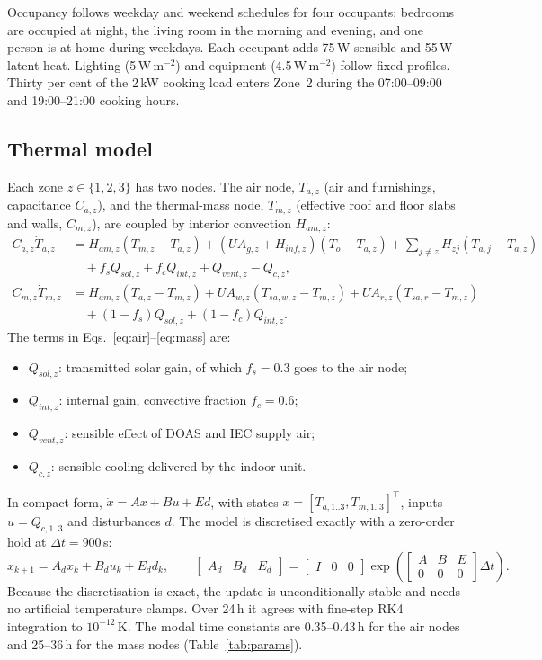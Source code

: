 Occupancy follows weekday and weekend schedules for four occupants: bedrooms are
occupied at night, the living room in the morning and evening, and one person is at
home during weekdays. Each occupant adds 75\,W sensible and 55\,W latent heat. Lighting
(5\,W\,m$^{-2}$) and equipment (4.5\,W\,m$^{-2}$) follow fixed profiles. Thirty per
cent of the 2\,kW cooking load enters Zone~2 during the 07:00--09:00 and 19:00--21:00
cooking hours.

\subsection{Thermal model}
Each zone $z\in\{1,2,3\}$ has two nodes. The air node, $T_{a,z}$ (air and furnishings,
capacitance $C_{a,z}$), and the thermal-mass node, $T_{m,z}$ (effective roof and floor
slabs and walls, $C_{m,z}$), are coupled by interior convection $H_{am,z}$:
\begin{align}
C_{a,z}\dot T_{a,z} &= H_{am,z}(T_{m,z}-T_{a,z}) + (UA_{g,z}+H_{inf,z})(T_o-T_{a,z})
  + \sum_{j\neq z} H_{zj}(T_{a,j}-T_{a,z}) \nonumber\\
  &\quad + f_s Q_{sol,z} + f_c Q_{int,z} + Q_{vent,z} - Q_{c,z}, \label{eq:air}\\
C_{m,z}\dot T_{m,z} &= H_{am,z}(T_{a,z}-T_{m,z}) + UA_{w,z}(T_{sa,w,z}-T_{m,z})
  + UA_{r,z}(T_{sa,r}-T_{m,z}) \nonumber\\
  &\quad + (1-f_s)Q_{sol,z} + (1-f_c)Q_{int,z}. \label{eq:mass}
\end{align}
The terms in Eqs.~\eqref{eq:air}--\eqref{eq:mass} are:
\begin{itemize}
  \item $Q_{sol,z}$: transmitted solar gain, of which $f_s=0.3$ goes to the air node;
  \item $Q_{int,z}$: internal gain, convective fraction $f_c=0.6$;
  \item $Q_{vent,z}$: sensible effect of DOAS and IEC supply air;
  \item $Q_{c,z}$: sensible cooling delivered by the indoor unit.
\end{itemize}
In compact form, $\dot{x}=Ax+Bu+Ed$, with states
$x=[T_{a,1..3},T_{m,1..3}]^\top$, inputs $u=Q_{c,1..3}$ and disturbances $d$. The model
is discretised exactly with a zero-order hold at $\Delta t=900$\,s:
\begin{equation}
x_{k+1}=A_d x_k+B_d u_k+E_d d_k,\qquad
\begin{bmatrix}A_d & B_d & E_d\end{bmatrix}
=\begin{bmatrix}I&0&0\end{bmatrix}\exp\!\left(\begin{bmatrix}A&B&E\\0&0&0\end{bmatrix}\Delta t\right).
\end{equation}
Because the discretisation is exact, the update is unconditionally stable and needs no
artificial temperature clamps. Over 24\,h it agrees with fine-step RK4 integration to
$10^{-12}$\,K. The modal time constants are 0.35--0.43\,h for the air nodes and
25--36\,h for the mass nodes (Table~\ref{tab:params}).


